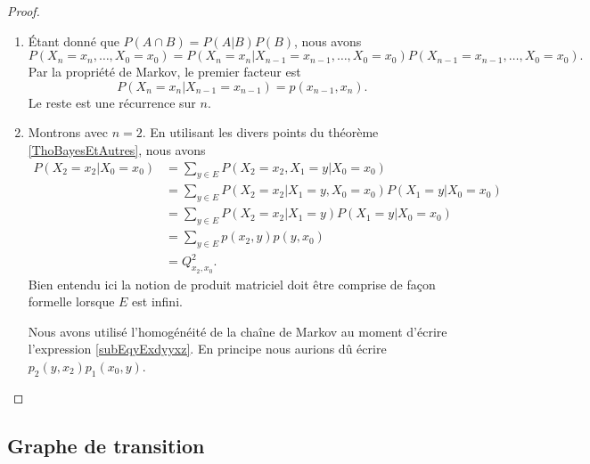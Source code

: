 \begin{proof}
    \begin{enumerate}
        \item
            Étant donné que \( P(A\cap B)=P(A|B)P(B)\), nous avons
            \begin{equation}
                P(X_n=x_n,\ldots,X_0=x_0)=P(X_n=x_n|X_{n-1}=x_{n-1},\ldots,X_0=x_0)P(X_{n-1}=x_{n-1},\ldots,X_0=x_0).
            \end{equation}
            Par la propriété de Markov, le premier facteur est
            \begin{equation}
                P(X_n=x_n|X_{n-1}=x_{n-1})=p(x_{n-1},x_n).
            \end{equation}
            Le reste est une récurrence sur \( n\).

        \item
            Montrons avec \( n=2\). En utilisant les divers points du théorème \ref{ThoBayesEtAutres}, nous avons
            \begin{subequations}
                \begin{align}
                    P(X_2=x_2|X_0=x_0)&=\sum_{y\in E}P(X_2=x_2,X_1=y|X_0=x_0)\\
                    &=\sum_{y\in E}P(X_2=x_2|X_1=y,X_0=x_0)P(X_1=y|X_0=x_0)\\
                    &=\sum_{y\in E}P(X_2=x_2|X_1=y)P(X_1=y|X_0=x_0)\\
                    &=\sum_{y\in E}p(x_2,y)p(y,x_0) \label{subEqyExdyyxz}\\
                    &=Q^2_{x_2,x_0}.
                \end{align}
            \end{subequations}
            Bien entendu ici la notion de produit matriciel doit être comprise de façon formelle lorsque \( E\) est infini.
            \begin{remark}
                Nous avons utilisé l'homogénéité de la chaîne de Markov au moment d'écrire l'expression \eqref{subEqyExdyyxz}. En principe nous aurions dû écrire \( p_2(y,x_2)p_1(x_0,y)\).
            \end{remark}
    \end{enumerate}
\end{proof}

\subsection{Graphe de transition}

